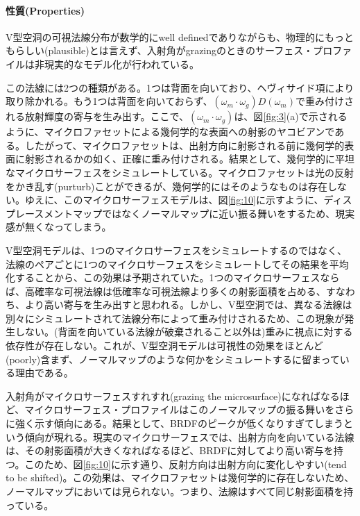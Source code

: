 \documentclass[a4j,xelatex,ja=standard]{bxjsarticle}
\begin{document}
\paragraph{性質(Properties)}

V型空洞の可視法線分布が数学的にwell definedでありながらも、物理的にもっともらしい(plausible)とは言えず、入射角がgrazingのときのサーフェス・プロファイルは非現実的なモデル化が行われている。

この法線には2つの種類がある。1つは背面を向いており、ヘヴィサイド項により取り除かれる。もう1つは背面を向いておらず、$(\omega_m \cdot \omega_g) D(\omega_m)$で重み付けされる放射輝度の寄与を生み出す。ここで、$(\omega_m \cdot \omega_g)$は、図\ref{fig:3}(a)で示されるように、マイクロファセットによる幾何学的な表面への射影のヤコビアンである。したがって、マイクロファセットは、出射方向に射影される前に幾何学的表面に射影されるかの如く、正確に重み付けされる。結果として、幾何学的に平坦なマイクロサーフェスをシミュレートしている。マイクロファセットは光の反射をかき乱す(purturb)ことができるが、幾何学的にはそのようなものは存在しない。ゆえに、このマイクロサーフェスモデルは、図\ref{fig:10}に示すように、ディスプレースメントマップではなくノーマルマップに近い振る舞いをするため、現実感が無くなってしまう。

V型空洞モデルは、1つのマイクロサーフェスをシミュレートするのではなく、法線のペアごとに1つのマイクロサーフェスをシミュレートしてその結果を平均化することから、この効果は予期されていた。1つのマイクロサーフェスならば、高確率な可視法線は低確率な可視法線より多くの射影面積を占める、すなわち、より高い寄与を生み出すと思われる。しかし、V型空洞では、異なる法線は別々にシミュレートされて法線分布によって重み付けされるため、この現象が発生しない。(背面を向いている法線が破棄されること以外は)重みに視点に対する依存性が存在しない。これが、V型空洞モデルは可視性の効果をほとんど(poorly)含まず、ノーマルマップのような何かをシミュレートするに留まっている理由である。

入射角がマイクロサーフェスすれすれ(grazing the microsurface)になればなるほど、マイクロサーフェス・プロファイルはこのノーマルマップの振る舞いをさらに強く示す傾向にある。結果として、BRDFのピークが低くなりすぎてしまうという傾向が現れる。現実のマイクロサーフェスでは、出射方向を向いている法線は、その射影面積が大きくなればなるほど、BRDFに対してより高い寄与を持つ。このため、図\ref{fig:10}に示す通り、反射方向は出射方向に変化しやすい(tend to be shifted)。この効果は、マイクロファセットは幾何学的に存在しないため、ノーマルマップにおいては見られない。つまり、法線はすべて同じ射影面積を持っている。
\end{document}
